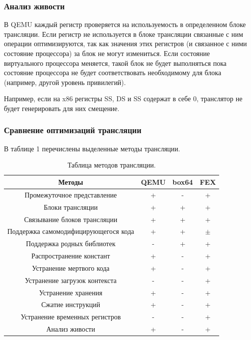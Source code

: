 \subsubsection{Анализ живости}

В QEMU каждый регистр проверяется на используемость в определенном блоке трансляции. Если регистр не используется в блоке трансляции связанные с ним операции оптимизируются, так как значения этих регистров (и связанное с ними состояние процессора) за блок не могут измениться. Если состояние виртуального процессора меняется, такой блок не будет выполняться пока состояние процессора не будет соответствовать необходимому для блока (например, другой уровень привилегий).

Например, если на x86 регистры SS, DS и SS содержат в себе 0, транслятор не будет генерировать для них смещение.

\subsubsection{Сравнение оптимизаций трансляции}

В таблице 1 %
перечислены выделенные методы трансляции. 

\begin{table}[!htb]
	\label{table:methods}
	\begin{center}
		\caption{Таблица методов трансляции.}
			\begin{tabular}{|c|c|c|c|}
				\hline
				\bfseries Методы & \bfseries QEMU & \bfseries box64 & \bfseries FEX  \\
				\hline
				Промежуточное представление & + & - & + \\ \hline
				Блоки трансляции & + & + & + \\ \hline
				Связывание блоков трансляции & + & + & + \\ \hline
				Поддержка самомодифицирующегося кода & + & + & $\pm$ \\ \hline
				Поддержка родных библиотек & - & + & + \\ \hline
				Распространение констант & + & - & + \\ \hline
				Устранение мертвого кода & + & - & + \\ \hline
				Устранение загрузок контекста & - & - & + \\ \hline
				Устранение хранения & + & - & + \\ \hline
				Сжатие инструкций & + & - & + \\ \hline
				Устранение временных регистров & - & - & + \\ \hline
				Анализ живости & + & - & + \\ \hline
		\end{tabular}
	\end{center}
\end{table}

